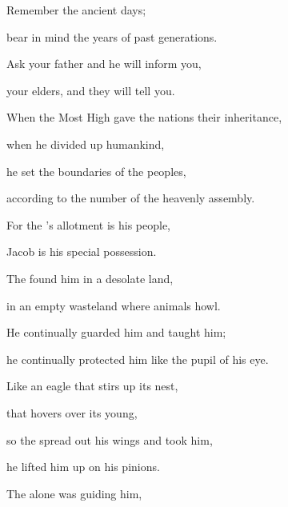{\par }{\Q {}Remember
the ancient
days;
\par }{\Q bear in mind
the years
of past
generations.
\par }{\Q Ask
your father
and he will inform
you,
\par }{\Q your elders,
and they will tell you.
\par }{\Q {}When the Most
High gave the nations
their inheritance,
\par }{\Q when he divided
up
humankind,
\par }{\Q he set
the boundaries
of the peoples,
\par }{\Q according to the number of the heavenly assembly.
\par }{\Q {}For
the
{}’s
allotment
is his people,
\par }{\Q Jacob
is his special
possession.
\par }{\Q {}The
{} found
him in a desolate
land,
\par }{\Q in an empty wasteland
where animals howl.
\par }{\Q He continually guarded him and taught him;
\par }{\Q he continually protected him
like
the pupil
of his eye.
\par }{\Q {}Like an eagle
that stirs
up its nest,
\par }{\Q that hovers over
its young,
\par }{\Q so the
{}
spread
out his wings
and took
him,

\par }{\Q he lifted
him up
on
his pinions.
\par }{\Q {}The
{}
alone
was guiding
him,

}
